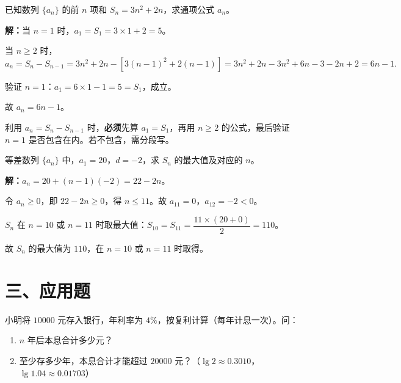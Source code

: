 \documentclass[12pt, a4paper]{ctexart}
\begin{document}
\begin{examplebox}[【例题8】$S_n$ 与 $a_n$ 的关系]
已知数列 $\{a_n\}$ 的前 $n$ 项和 $S_n = 3n^2 + 2n$，求通项公式 $a_n$。
\end{examplebox}

\noindent\textbf{解：}当 $n = 1$ 时，$a_1 = S_1 = 3 \times 1 + 2 = 5$。

当 $n \geqslant 2$ 时，
\[
  a_n = S_n - S_{n-1} = 3n^2 + 2n - [3(n-1)^2 + 2(n-1)] = 3n^2 + 2n - 3n^2 + 6n - 3 - 2n + 2 = 6n - 1.
\]

验证 $n = 1$：$a_1 = 6 \times 1 - 1 = 5 = S_1$，成立。

故 $a_n = 6n - 1$。

\begin{warnbox}[易错提醒]
利用 $a_n = S_n - S_{n-1}$ 时，\textbf{必须}先算 $a_1 = S_1$，再用 $n \geqslant 2$ 的公式，最后验证 $n = 1$ 是否包含在内。若不包含，需分段写。
\end{warnbox}

\begin{examplebox}
等差数列 $\{a_n\}$ 中，$a_1 = 20$，$d = -2$，求 $S_n$ 的最大值及对应的 $n$。
\end{examplebox}

\noindent\textbf{解：}$a_n = 20 + (n-1)(-2) = 22 - 2n$。

令 $a_n \geqslant 0$，即 $22 - 2n \geqslant 0$，得 $n \leqslant 11$。故 $a_{11} = 0$，$a_{12} = -2 < 0$。

$S_n$ 在 $n = 10$ 或 $n = 11$ 时取最大值：$S_{10} = S_{11} = \dfrac{11 \times (20 + 0)}{2} = 110$。

故 $S_n$ 的最大值为 $110$，在 $n = 10$ 或 $n = 11$ 时取得。

\section*{\textcolor{apppurple}{三、应用题}}

\begin{appbox}[【应用1】复利问题]
小明将 $10000$ 元存入银行，年利率为 $4\%$，按复利计算（每年计息一次）。问：
\begin{enumerate}[label=(\arabic*)]
  \item $n$ 年后本息合计多少元？
  \item 至少存多少年，本息合计才能超过 $20000$ 元？（$\lg 2 \approx 0.3010$，$\lg 1.04 \approx 0.01703$）
\end{enumerate}
\end{appbox}
\end{document}
